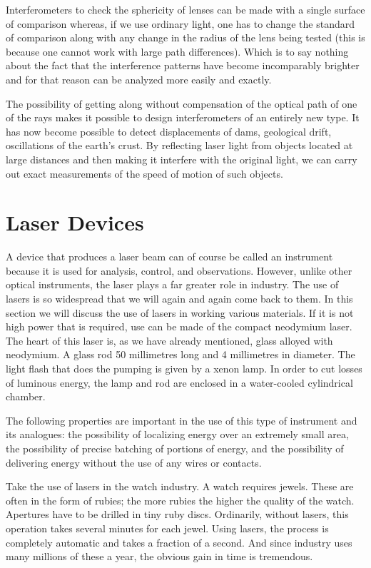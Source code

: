 Interferometers to check the sphericity of lenses can be made with a single surface of comparison whereas, if we use ordinary light, one has to change the standard of comparison along with any change in the radius of the lens being tested (this is because one cannot work with large path differences). Which is to say nothing about the fact that the interference patterns have become incomparably brighter and for that reason can be analyzed more easily and exactly.

The possibility of getting along without compensation of the optical path of one of the rays makes it possible to design interferometers of an entirely new type. It has now become possible to detect displacements of dams, geological drift, oscillations of the earth’s crust. By re­flecting laser light from objects located at large distances and then making it interfere with the original light, we can carry out exact measurements of the speed of motion of such objects.

\section{Laser Devices}

A device that produces a laser beam can of course be called an instrument because it is used for analysis, control, and observations. However, unlike other optical instruments, the laser plays a far greater role in industry. The use of lasers is so widespread that we will again and again come back to them. In this section we will discuss the use of lasers in working various materials. If it is not high power that is required, use can be made of the compact neodymium laser. The heart of this laser is, as we have already mentioned, glass alloyed with neody­mium. A glass rod 50 millimetres long and 4 millimetres in diameter. The light flash that does the pumping is given by a xenon lamp. In order to cut losses of luminous energy, the lamp and rod are enclosed in a water-cooled cylindrical chamber.

The following properties are important in the use of this type of instrument and its analogues: the possibility of localizing energy over an extremely small area, the possibility of precise batching of portions of energy, and the possibility of delivering energy without the use of any wires or contacts.

Take the use of lasers in the watch industry. A watch requires jewels. These are often in the form of rubies; the more rubies the higher the quality of the watch. Apertures have to be drilled in tiny ruby discs. Ordinarily, without lasers, this operation takes several minutes for each jewel. Using lasers, the process is completely automatic and takes a fraction of a second. And since industry uses many millions of these a year, the obvious gain in time is tremendous.

